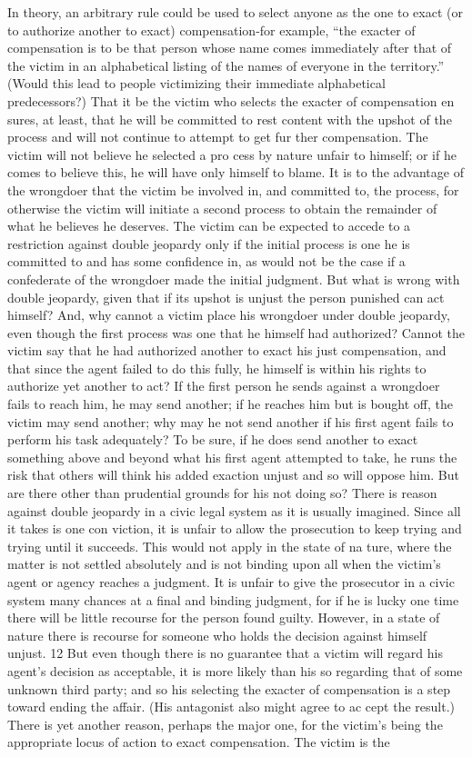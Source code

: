 \documentclass[11pt,openany]{book}
\begin{document}
In theory, an arbitrary rule could be used to select anyone as the one to exact (or to authorize another to exact) compensation-for example, ``the exacter of compensation is to be that person whose name comes immediately after that of the victim in an alphabetical listing of the names of everyone in the territory.'' (Would this lead to people victimizing their immediate alphabetical predecessors?) That it be the victim who selects the exacter of compensation en sures, at least, that he will be committed to rest content with the upshot of the process and will not continue to attempt to get fur ther compensation. The victim will not believe he selected a pro cess by nature unfair to himself; or if he comes to believe this, he will have only himself to blame. It is to the advantage of the wrongdoer that the victim be involved in, and committed to, the process, for otherwise the victim will initiate a second process to obtain the remainder of what he believes he deserves. The victim can be expected to accede to a restriction against double jeopardy only if the initial process is one he is committed to and has some confidence in, as would not be the case if a confederate of the wrongdoer made the initial judgment. But what is wrong with double jeopardy, given that if its upshot is unjust the person punished can act himself? And, why cannot a victim place his wrongdoer under double jeopardy, even though the first process was one that he himself had authorized? Cannot the victim say that he had authorized another to exact his just compensation, and that since the agent failed to do this fully, he himself is within his rights to authorize yet another to act? If the first person he sends against a wrongdoer fails to reach him, he may send another; if he reaches him but is bought off, the victim may send another; why may he not send another if his first agent fails to perform his task adequately? To be sure, if he does send another to exact something above and beyond what his first agent attempted to take, he runs the risk that others will think his added exaction unjust and so will oppose him. But are there other than prudential grounds for his not doing so? There is reason against double jeopardy in a civic legal system as it is usually imagined. Since all it takes is one con viction, it is unfair to allow the prosecution to keep trying and trying until it succeeds. This would not apply in the state of na ture, where the matter is not settled absolutely and is not binding upon all when the victim's agent or agency reaches a judgment. It is unfair to give the prosecutor in a civic system many chances at a final and binding judgment, for if he is lucky one time there will be little recourse for the person found guilty. However, in a state of nature there is recourse for someone who holds the decision against himself unjust. 12 But even though there is no guarantee that a victim will regard his agent's decision as acceptable, it is more likely than his so regarding that of some unknown third party; and so his selecting the exacter of compensation is a step toward ending the affair. (His antagonist also might agree to ac cept the result.) There is yet another reason, perhaps the major one, for the victim's being the appropriate locus of action to exact compensation. The victim is the 
\end{document}

